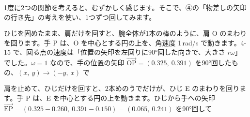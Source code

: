 1度に2つの関節を考えると、むずかしく感じます。そこで、④の「物差しの矢印の行き先」の考えを使い、1つずつ回してみます。

ひじを固めたまま、肩だけを回すと、腕全体が1本の棒のように、肩 O のまわりを回ります。手 P は、O を中心とする円の上を、角速度 1\,rad/s で動きます。4-15 で、回る点の速度は「位置の矢印を左回りに90°回した向きで、大きさ $r\omega$」でした。$\omega=1$ なので、手の位置の矢印 $\overrightarrow{\mathrm{OP}}=(0.325,\ 0.391)$ を90°回したもの、$(x,\ y)\to(-y,\ x)$ で

肩を止めて、ひじだけを回すと、2本めのうでだけが、ひじ E のまわりを回ります。手 P は、E を中心とする円の上を動きます。ひじから手への矢印 $\overrightarrow{\mathrm{EP}}=(0.325-0.260,\ 0.391-0.150)=(0.065,\ 0.241)$ を90°回して

